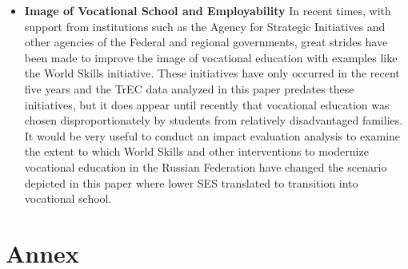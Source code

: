 \documentclass[alpha-refs,fleqn]{wiley-article_p2}
\begin{document}
\begin{itemize}
\begin{itemize}
\item \textbf{Image of Vocational School and Employability} In recent times, with support from institutions such as the Agency for Strategic Initiatives and other agencies of the Federal and regional governments, great strides have been made to improve the image of vocational education with examples like the World Skills initiative. These initiatives have only occurred in the recent five years and the TrEC data analyzed in this paper predates these initiatives, but it does appear until recently that vocational education was chosen disproportionately by students from relatively disadvantaged families. It would be very useful to conduct an impact evaluation analysis to examine the extent to which World Skills and other interventions to modernize vocational education in the Russian Federation have changed the scenario depicted in this paper where lower SES translated to transition into vocational school. 

\end{itemize}

\end{itemize}



\newpage


\appendix
\renewcommand\thefigure{\thesection.\arabic{figure}}   
\section{Annex}
\setcounter{figure}{0} 
\end{document}
